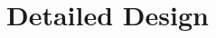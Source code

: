 \documentclass[11pt]{report}
\begin{document}
\chapter{Detailed Design}\label{ch:detailed-design}
\end{document}
